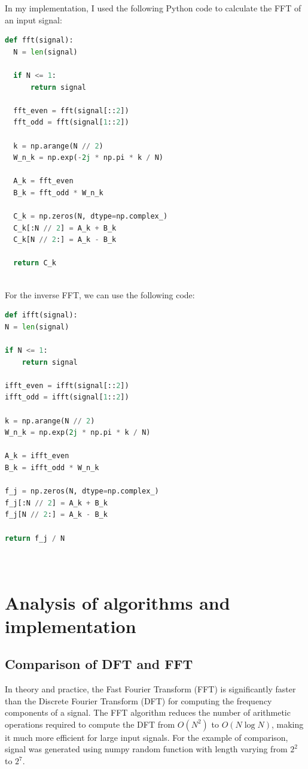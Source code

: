 \documentclass[a4paper,12pt,fleqn]{article}
\begin{document}
In my implementation, I used the following Python code to calculate the FFT of an input signal:
\begin{lstlisting}[language=Python]
def fft(signal):
  N = len(signal)
  
  if N <= 1:
      return signal
      
  fft_even = fft(signal[::2])
  fft_odd = fft(signal[1::2])
  
  k = np.arange(N // 2)
  W_n_k = np.exp(-2j * np.pi * k / N)
  
  A_k = fft_even
  B_k = fft_odd * W_n_k
  
  C_k = np.zeros(N, dtype=np.complex_)
  C_k[:N // 2] = A_k + B_k
  C_k[N // 2:] = A_k - B_k
  
  return C_k 
  
\end{lstlisting}
\newpage
For the inverse FFT, we can use the following code:

\begin{lstlisting}[language=Python]
def ifft(signal):
N = len(signal)

if N <= 1:
    return signal

ifft_even = ifft(signal[::2])
ifft_odd = ifft(signal[1::2])

k = np.arange(N // 2)
W_n_k = np.exp(2j * np.pi * k / N)

A_k = ifft_even
B_k = ifft_odd * W_n_k

f_j = np.zeros(N, dtype=np.complex_)
f_j[:N // 2] = A_k + B_k
f_j[N // 2:] = A_k - B_k

return f_j / N




\end{lstlisting}


\section{Analysis of algorithms and implementation}

\subsection{Comparison of DFT and FFT}

\hspace{1 em}In theory and practice, the Fast Fourier Transform (FFT) is significantly 
faster than the Discrete Fourier Transform (DFT) for computing the frequency components 
of a signal. The FFT algorithm reduces the number of arithmetic operations required 
to compute the DFT from $O(N^2)$ to $O(N \log N)$, making it much more efficient for 
large input signals. For the example of comparison, signal was generated using numpy
random function with length varying from $2^2$ to $2^7$.
\end{document}
